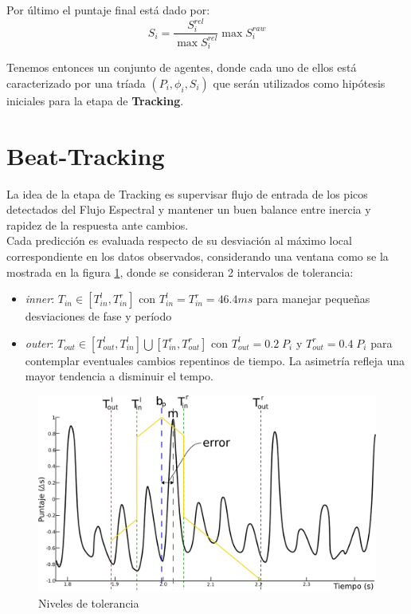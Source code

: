 \documentclass[12pt,a4paper,titlepage]{report}
\begin{document}
Por último el puntaje final está dado por:
\begin{equation}
S_i=\frac{S_i^{rel}}{\max S_i^{rel}}\max S_i^{raw}
\label{ec:S}
\end{equation}

Tenemos entonces un conjunto de agentes, donde cada uno de ellos está caracterizado por una tríada $(P_i,\phi _i,S_i)$ que serán utilizados como hipótesis iniciales para la etapa de \textbf{Tracking}.

\section{Beat-Tracking}
\label{sec:tracking}

La idea de la etapa de Tracking es supervisar flujo de entrada de los picos detectados del Flujo Espectral y mantener un buen balance entre inercia y rapidez de la respuesta ante cambios.\\

Cada predicción es evaluada respecto de su desviación al máximo local correspondiente en los datos observados, considerando una ventana como se la mostrada en la figura \ref{fig:grafica}, donde se consideran 2 intervalos de tolerancia:
\begin{itemize}
\item \emph{inner}: $T_{in}\in[T_{in}^l,T_{in}^r]$ con $T_{in}^l=T_{in}^r=46.4ms$ para manejar pequeñas desviaciones de fase y período
\item \emph{outer}: $T_{out}\in[T_{out}^l,T_{in}^l] \bigcup [T_{in}^r,T_{out}^r]$ con $T_{out}^l=0.2\;P_i$ y $T_{out}^r=0.4\;P_i$ para contemplar eventuales cambios repentinos de tiempo. La asimetría refleja una mayor tendencia a disminuir el tempo.\\
\end{itemize}

\begin{figure}[h!]
  \begin{center}
  \vspace*{-10pt}
  \includegraphics[width=.8\textwidth]{./pics/graficamejor.png}
  \end{center}
  \vspace{-10pt}
  \caption{Niveles de tolerancia}
  \label{fig:grafica}
\end{figure}
\end{document}
